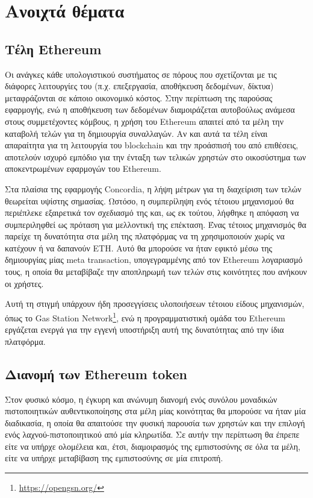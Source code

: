 \section{Ανοιχτά θέματα}\label{section:5-4-open-areas}

\subsection{Τέλη Ethereum}\label{subsection:5-4-1-ethereum-fees}

Οι ανάγκες κάθε υπολογιστικού συστήματος σε πόρους που σχετίζονται με τις διάφορες λειτουργίες του (π.χ. επεξεργασία, αποθήκευση δεδομένων, δίκτυα) μεταφράζονται σε κάποιο οικονομικό κόστος. Στην περίπτωση της παρούσας εφαρμογής, ενώ η αποθήκευση των δεδομένων διαμοιράζεται αυτοβούλως ανάμεσα στους συμμετέχοντες κόμβους, η χρήση του Ethereum απαιτεί από τα μέλη την καταβολή τελών για τη δημιουργία συναλλαγών. Αν και αυτά τα τέλη είναι απαραίτητα για τη λειτουργία του blockchain και την προάσπισή του από επιθέσεις, αποτελούν ισχυρό εμπόδιο για την ένταξη των τελικών χρηστών στο οικοσύστημα των αποκεντρωμένων εφαρμογών του Ethereum.

Στα πλαίσια της εφαρμογής Concordia, η λήψη μέτρων για τη διαχείριση των τελών θεωρείται υψίστης σημασίας. Ωστόσο, η συμπερίληψη ενός τέτοιου μηχανισμού θα περιέπλεκε εξαιρετικά τον σχεδιασμό της και, ως εκ τούτου, λήφθηκε η απόφαση να συμπεριληφθεί ως πρόταση για μελλοντική της επέκταση. Ένας τέτοιος μηχανισμός θα παρείχε τη δυνατότητα στα μέλη της πλατφόρμας να τη χρησιμοποιούν χωρίς να κατέχουν ή να δαπανούν ETH. Αυτό θα μπορούσε να ήταν εφικτό μέσω της δημιουργίας μίας meta transaction, υπογεγραμμένης από τον Ethereum λογαριασμό τους, η οποία θα μεταβίβαζε την αποπληρωμή των τελών στις κοινότητες που ανήκουν οι χρήστες.

Αυτή τη στιγμή υπάρχουν ήδη προσεγγίσεις υλοποιήσεων τέτοιου είδους μηχανισμών, όπως το Gas Station Network\footnote{\url{https://opengsn.org/}}, ενώ η προγραμματιστική ομάδα του Ethereum εργάζεται ενεργά για την εγγενή υποστήριξη αυτή της δυνατότητας από την ίδια πλατφόρμα.

\subsection{Διανομή των Ethereum token}\label{subsection:5-4-2-token-distribution}

Στον φυσικό κόσμο, η έγκυρη και ανώνυμη διανομή ενός συνόλου μοναδικών πιστοποιητικών αυθεντικοποίησης στα μέλη μίας κοινότητας θα μπορούσε να ήταν μία διαδικασία, η οποία θα απαιτούσε την φυσική παρουσία των χρηστών και την επιλογή ενός λαχνού-πιστοποιητικού από μία κληρωτίδα. Σε αυτήν την περίπτωση θα έπρεπε είτε να υπήρχε ολομέλεια και, έτσι, διαμοιρασμός της εμπιστοσύνης σε όλα τα μέλη, είτε να υπήρχε μεταβίβαση της εμπιστοσύνης σε μία επιτροπή.

